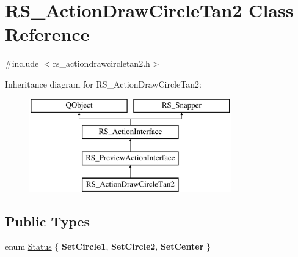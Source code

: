 \hypertarget{classRS__ActionDrawCircleTan2}{\section{R\-S\-\_\-\-Action\-Draw\-Circle\-Tan2 Class Reference}
\label{classRS__ActionDrawCircleTan2}
}


{\ttfamily \#include $<$rs\-\_\-actiondrawcircletan2.\-h$>$}

Inheritance diagram for R\-S\-\_\-\-Action\-Draw\-Circle\-Tan2\-:\begin{figure}[H]
\begin{center}
\leavevmode
\includegraphics[height=4.000000cm]{classRS__ActionDrawCircleTan2}
\end{center}
\end{figure}
\subsection*{Public Types}
\begin{DoxyCompactItemize}
\item 
enum \hyperlink{classRS__ActionDrawCircleTan2_a5c39bf1c5666cc7cb441e9673b2beb8c}{Status} \{ {\bfseries Set\-Circle1}, 
{\bfseries Set\-Circle2}, 
{\bfseries Set\-Center}
 \}
\end{DoxyCompactItemize}
